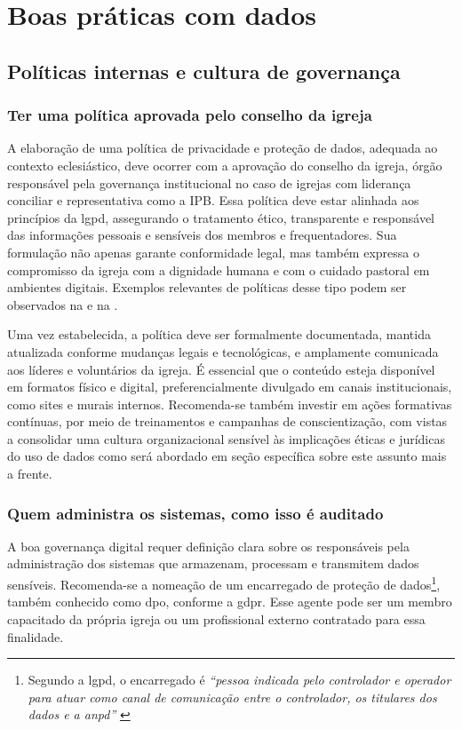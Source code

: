 \section{Boas práticas com dados}

\subsection{Políticas internas e cultura de governança}

\subsubsection{Ter uma política aprovada pelo conselho da igreja}

A elaboração de uma política de privacidade e proteção de dados, adequada ao contexto eclesiástico, deve ocorrer com a aprovação do conselho da igreja, órgão responsável pela governança institucional no caso de igrejas com liderança conciliar e representativa como a IPB. Essa política deve estar alinhada aos princípios da \gls{lgpd}, assegurando o tratamento ético, transparente e responsável das informações pessoais e sensíveis dos membros e frequentadores. Sua formulação não apenas garante conformidade legal, mas também expressa o compromisso da igreja com a dignidade humana e com o cuidado pastoral em ambientes digitais. Exemplos relevantes de políticas desse tipo podem ser observados na  e na .

Uma vez estabelecida, a política deve ser formalmente documentada, mantida atualizada conforme mudanças legais e tecnológicas, e amplamente comunicada aos líderes e voluntários da igreja. É essencial que o conteúdo esteja disponível em formatos físico e digital, preferencialmente divulgado em canais institucionais, como sites e murais internos. Recomenda-se também investir em ações formativas contínuas, por meio de treinamentos e campanhas de conscientização, com vistas a consolidar uma cultura organizacional sensível às implicações éticas e jurídicas do uso de dados como será abordado em seção específica sobre este assunto mais a frente.

\subsubsection{Quem administra os sistemas, como isso é auditado}

A boa governança digital requer definição clara sobre os responsáveis pela administração dos sistemas que armazenam, processam e transmitem dados sensíveis. Recomenda-se a nomeação de um encarregado de proteção de dados\footnote{Segundo a \gls{lgpd}, o encarregado é \textit{``pessoa indicada pelo controlador e operador para atuar como canal de comunicação entre o controlador, os titulares dos dados e a \gls{anpd}''} \cite[art. 5º, inciso VIII]{lgpd2018}}, também conhecido como \gls{dpo}, conforme a \gls{gdpr}. Esse agente pode ser um membro capacitado da própria igreja ou um profissional externo contratado para essa finalidade.

